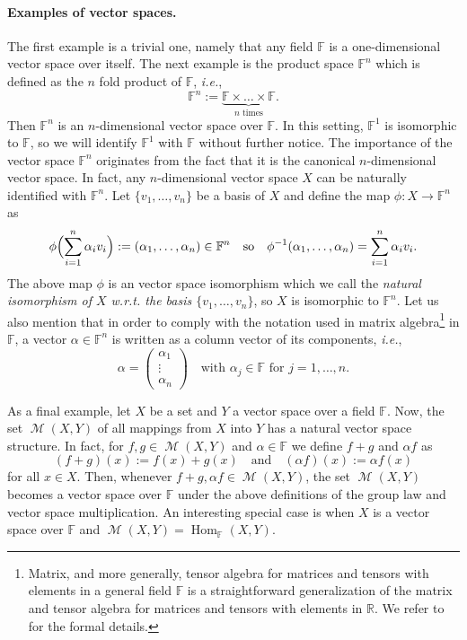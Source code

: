 \documentclass[a4paper]{paper}
\makeatletter
\newcommand{\Field}{\mathbb{F}}
\newcommand{\Real}{\mathbb{R}}
\newcommand{\Complex}{\mathbb{C}}
\DeclareMathOperator{\Hom}{Hom}
\DeclareMathOperator{\Map}{\mathcal{M}}
\newcommand{\ie}{\textsl{i.e.}\xspace}
\newcommand{\wrt}{{w.r.t.}\@\xspace}
\makeatother
\begin{document}
\paragraph{Examples of vector spaces.}
The first example is a trivial one, namely that any field $\Field$ is a one-dimensional 
vector space over itself. The next example is the product space $\Field^{n}$ which is  defined as 
the $n$ fold product of $\Field$, \ie,
\[ \Field^{n} := \underbrace{\Field \times \ldots \times \Field}_{\text{$n$ times}}. \]
Then $\Field^{n}$ is an $n$-dimensional vector space 
over $\Field$. In this setting, $\Field^1$ is isomorphic to $\Field$, so we will identify $\Field^1$ with $\Field$
without further notice. The importance of the vector space $\Field^{n}$ originates from the fact 
that it is the canonical $n$-dimensional vector space. In fact, any $n$-dimensional vector 
space $X$ can be naturally identified 
with $\Field^{n}$. Let  $\{ v_1,\ldots, v_{n} \}$ be a basis of $X$ and define the map 
$\phi \colon X \to \Field^{n}$ as
\[  \phi\Bigl( \sum_{i=1}^n \alpha_i v_i \Bigr) := (\alpha_1,\ldots,\alpha_{n})\in\Field^{n}
    \quad\text{so}\quad 
    \phi^{-1}(\alpha_1,\ldots,\alpha_{n}) = \sum_{i=1}^n \alpha_i v_i.
\]
The above map $\phi$ is an vector space isomorphism which we call the \emph{natural 
isomorphism of $X$ \wrt the basis $\{ v_1,\ldots, v_{n} \}$}, so $X$ is isomorphic to $\Field^{n}$.
Let us also mention that in order to comply with the notation used in 
matrix algebra\footnote{Matrix, and more generally, tensor algebra for matrices and tensors with 
elements in a general field $\Field$ is a straightforward generalization of the matrix and 
tensor algebra for matrices and tensors with elements in $\Real$. 
We refer to \cite[Chapter~II, Section~10 and Chapter~III]{Bo89} for the formal details.} 
in $\Field$, a vector $\alpha\in\Field^{n}$ is written as a column vector of its components, 
\ie,
\[ \alpha = \begin{pmatrix} \alpha_1 \\  \vdots \\  \alpha_{n} \end{pmatrix}
   \quad\text{with $\alpha_j \in \Field $ for $j=1,\ldots,n$.}
\]

As a final example,  let $X$ be a set and $Y$ a vector space over a field $\Field$. Now, the 
set $\Map(X,Y)$ of all mappings from $X$ into $Y$ has a natural vector space 
structure. In fact, for $f,g\in \Map(X,Y)$ and $\alpha\in\Field$ we define $f+g$ and $\alpha f$ as 
\[ (f+g)(x):= f(x)+g(x) \quad\text{and}\quad (\alpha f)(x):=\alpha f(x) \]
for all $x\in X$. Then, whenever $f+g, \alpha f\in  \Map(X,Y)$, the set $\Map(X,Y)$ becomes
a vector space over $\Field$ under the above definitions of the group law and vector space 
multiplication. An interesting special case is when $X$ is a vector space over $\Field$ and 
$\Map(X,Y)= \Hom_{\Field}(X,Y)$.





\end{document}
